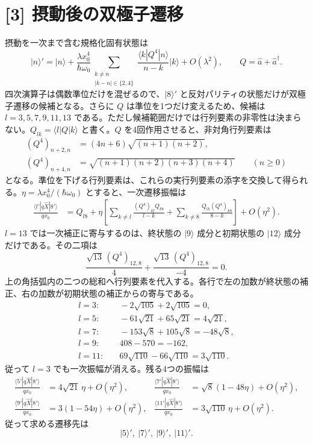 \documentclass[11pt,a4paper]{article}
\begin{document}
\section*{[3] 摂動後の双極子遷移}
摂動を一次まで含む規格化固有状態は
\begin{equation}
 |n\rangle'=|n\rangle+
 \frac{\lambda x_0^4}{\hbar\omega_0}
 \sum_{\substack{k\ne n\\ |k-n|\in\{2,4\}}}
 \frac{\langle k|Q^4|n\rangle}{n-k}|k\rangle+O(\lambda^2),
 \qquad Q=\hat a+\hat a^\dagger.
\end{equation}
四次演算子は偶数準位だけを混ぜるので、$|8\rangle'$ と反対パリティの状態だけが双極子遷移の候補となる。さらに $Q$ は準位を1つだけ変えるため、候補は $l=3,5,7,9,11,13$ である。ただし候補範囲だけでは行列要素の非零性は決まらない。$Q_{lk}=\langle l|Q|k\rangle$ と書く。$Q$ を4回作用させると、非対角行列要素は
\begin{align}
 (Q^4)_{n+2,n}&=(4n+6)\sqrt{(n+1)(n+2)},\\
 (Q^4)_{n+4,n}&=\sqrt{(n+1)(n+2)(n+3)(n+4)}
 \qquad(n\ge0)
\end{align}
となる。準位を下げる行列要素は、これらの実行列要素の添字を交換して得られる。$\eta=\lambda x_0^4/(\hbar\omega_0)$ とすると、一次遷移振幅は
\begin{align}
 \frac{\langle l'|q\hat X|8'\rangle}{q x_0}
 &=Q_{l8}+\eta\left[
 \sum_{k\ne l}\frac{(Q^4)_{kl}Q_{k8}}{l-k}
 +\sum_{k\ne8}\frac{Q_{lk}(Q^4)_{k8}}{8-k}\right]+O(\eta^2).
\end{align}
$l=13$ では一次補正に寄与するのは、終状態の $|9\rangle$ 成分と初期状態の $|12\rangle$ 成分だけである。その二項は
\begin{equation}
  \frac{\sqrt{13}\,(Q^4)_{12,8}}{4}
  +\frac{\sqrt{13}\,(Q^4)_{12,8}}{-4}=0.
\end{equation}
上の角括弧内の二つの総和へ行列要素を代入する。各行で左の加数が終状態の補正、右の加数が初期状態の補正からの寄与である。
\begin{align}
 l=3:&\quad -2\sqrt{105}+2\sqrt{105}=0,\\
 l=5:&\quad -61\sqrt{21}+65\sqrt{21}=4\sqrt{21},\\
 l=7:&\quad -153\sqrt8+105\sqrt8=-48\sqrt8,\\
 l=9:&\quad 408-570=-162,\\
 l=11:&\quad 69\sqrt{110}-66\sqrt{110}=3\sqrt{110}.
\end{align}
従って $l=3$ でも一次振幅が消える。残る4つの振幅は
\begin{align}
 \frac{\langle5'|q\hat X|8'\rangle}{q x_0}&=4\sqrt{21}\,\eta+O(\eta^2),&
 \frac{\langle7'|q\hat X|8'\rangle}{q x_0}&=\sqrt8(1-48\eta)+O(\eta^2),\\
 \frac{\langle9'|q\hat X|8'\rangle}{q x_0}&=3(1-54\eta)+O(\eta^2),&
 \frac{\langle11'|q\hat X|8'\rangle}{q x_0}&=3\sqrt{110}\,\eta+O(\eta^2).
\end{align}
従って求める遷移先は
\begin{equation}
  \boxed{|5\rangle',\ |7\rangle',\ |9\rangle',\ |11\rangle'.}
\end{equation}
\end{document}
